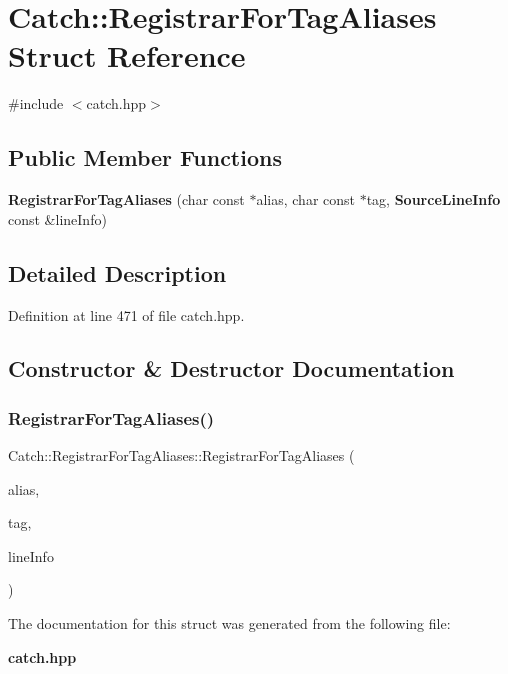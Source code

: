 \section{Catch\+::Registrar\+For\+Tag\+Aliases Struct Reference}
\label{struct_catch_1_1_registrar_for_tag_aliases}


{\ttfamily \#include $<$catch.\+hpp$>$}

\subsection*{Public Member Functions}
\begin{DoxyCompactItemize}
\item 
\textbf{ Registrar\+For\+Tag\+Aliases} (char const $\ast$alias, char const $\ast$tag, \textbf{ Source\+Line\+Info} const \&line\+Info)
\end{DoxyCompactItemize}


\subsection{Detailed Description}


Definition at line 471 of file catch.\+hpp.



\subsection{Constructor \& Destructor Documentation}
\mbox{\label{struct_catch_1_1_registrar_for_tag_aliases_ae4e45830e4763bcd65d55d8db9167b69}} 
\subsubsection{RegistrarForTagAliases()}
{\footnotesize\ttfamily Catch\+::\+Registrar\+For\+Tag\+Aliases\+::\+Registrar\+For\+Tag\+Aliases (\begin{DoxyParamCaption}\item[{char const $\ast$}]{alias,  }\item[{char const $\ast$}]{tag,  }\item[{\textbf{ Source\+Line\+Info} const \&}]{line\+Info }\end{DoxyParamCaption})}



The documentation for this struct was generated from the following file\+:\begin{DoxyCompactItemize}
\item 
\textbf{ catch.\+hpp}\end{DoxyCompactItemize}
